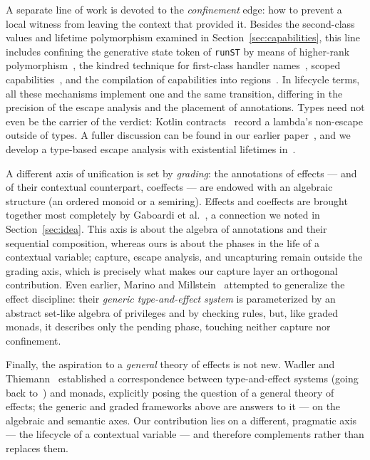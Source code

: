\documentclass[11pt]{article}
\begin{document}
A separate line of work is devoted to the \emph{confinement} edge: how to prevent a local
witness from leaving the context that provided it. Besides the second-class values and
lifetime polymorphism examined in Section~\ref{sec:capabilities}, this line includes
confining the generative state token of \texttt{runST} by means of higher-rank
polymorphism~\cite{launchbury1995state}, the kindred technique for first-class handler
names~\cite{xie2022first}, scoped capabilities~\cite{odersky2022scoped}, and the
compilation of capabilities into regions~\cite{mueller2023regions}. In lifecycle terms,
all these mechanisms implement one and the same transition, differing in the precision of
the escape analysis and the placement of annotations. Types need not even be the carrier
of the verdict: Kotlin contracts~\cite{akhin2021kotlin} record a lambda's non-escape
outside of types. A fuller discussion can be found in our earlier
paper~\cite{stoyan2024modern}, and we develop a type-based escape analysis with
existential lifetimes in~\cite{stoyan2025existential}.

A different axis of unification is set by \emph{grading}: the annotations of effects ---
and of their contextual counterpart, coeffects --- are endowed with an algebraic
structure (an ordered monoid or a semiring). Effects and coeffects are brought together
most completely by Gaboardi et al.~\cite{gaboardi2016combining}, a connection we noted in
Section~\ref{sec:idea}. This axis is about the algebra of annotations and their
sequential composition, whereas ours is about the phases in the life of a contextual
variable; capture, escape analysis, and uncapturing remain outside the grading axis,
which is precisely what makes our capture layer an orthogonal contribution. Even earlier,
Marino and Millstein~\cite{marino2009generic} attempted to generalize the effect
discipline: their \emph{generic type-and-effect system} is parameterized by an abstract
set-like algebra of privileges and by checking rules, but, like graded monads, it
describes only the pending phase, touching neither capture nor confinement.

Finally, the aspiration to a \emph{general} theory of effects is not new. Wadler and
Thiemann~\cite{wadler2003marriage} established a correspondence between type-and-effect
systems (going back to~\cite{lucassen1988polymorphic, talpin1994type}) and monads,
explicitly posing the question of a general theory of effects; the generic and graded
frameworks above are answers to it --- on the algebraic and semantic axes. Our
contribution lies on a different, pragmatic axis --- the lifecycle of a contextual
variable --- and therefore complements rather than replaces them.
\end{document}
